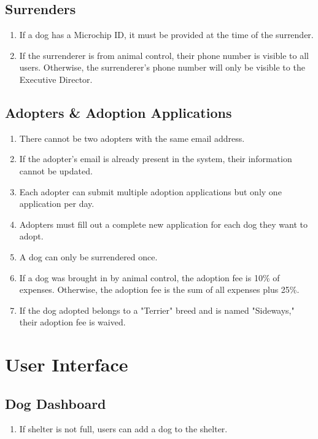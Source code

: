 \documentclass{article}
\begin{document}
\subsection{Surrenders}
\begin{enumerate}
    \item If a dog has a Microchip ID, it must be provided at the time of the surrender.
    \item If the surrenderer is from animal control, their phone number is visible to all users. Otherwise, the surrenderer's phone number will only be visible to the Executive Director.
\end{enumerate}

\subsection{Adopters \& Adoption Applications}
\begin{enumerate}
    \item There cannot be two adopters with the same email address.
    \item If the adopter's email is already present in the system, their information cannot be updated.
    \item Each adopter can submit multiple adoption applications but only one application per day.
    \item Adopters must fill out a complete new application for each dog they want to adopt.
    \item A dog can only be surrendered once.
    \item If a dog was brought in by animal control, the adoption fee is 10\% of expenses. Otherwise, the adoption fee is the sum of all expenses plus 25\%.
    \item If the dog adopted belongs to a "Terrier" breed and is named "Sideways," their adoption fee is waived.
\end{enumerate}

\section{User Interface}

\subsection{Dog Dashboard}
\begin{enumerate}
    \item If shelter is not full, users can add a dog to the shelter.
\end{enumerate}
\end{document}
